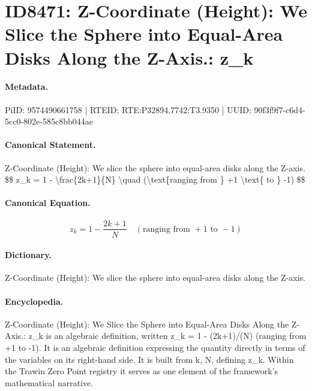 \section*{ID8471: Z-Coordinate (Height): We Slice the Sphere into Equal-Area Disks Along the Z-Axis.: z\_k}
\paragraph{Metadata.}
PiID: 9574490661758 | RTEID: RTE:P32894.7742:T3.9350 | UUID: 90f3f9f7-c6d4-5cc0-802e-585c8bb044ae

\paragraph{Canonical Statement.}
Z-Coordinate (Height): We slice the sphere into equal-area disks along the Z-axis. \$\$ z\_k = 1 - \textbackslash{}frac\{2k+1\}\{N\} \textbackslash{}quad (\textbackslash{}text\{ranging from \} +1 \textbackslash{}text\{ to \} -1) \$\$

\paragraph{Canonical Equation.}
\[
z_k = 1 - \frac{2k+1}{N} \quad (\text{ranging from } +1 \text{ to } -1)
\]

\paragraph{Dictionary.}
Z-Coordinate (Height): We slice the sphere into equal-area disks along the Z-axis.

\paragraph{Encyclopedia.}
Z-Coordinate (Height): We Slice the Sphere into Equal-Area Disks Along the Z-Axis.: z\_k is an algebraic definition, written z\_k = 1 - (2k+1)/(N) (ranging from +1 to -1). It is an algebraic definition expressing the quantity directly in terms of the variables on its right-hand side. It is built from k, N, defining z\_k. Within the Trawin Zero Point registry it serves as one element of the framework's mathematical narrative.
